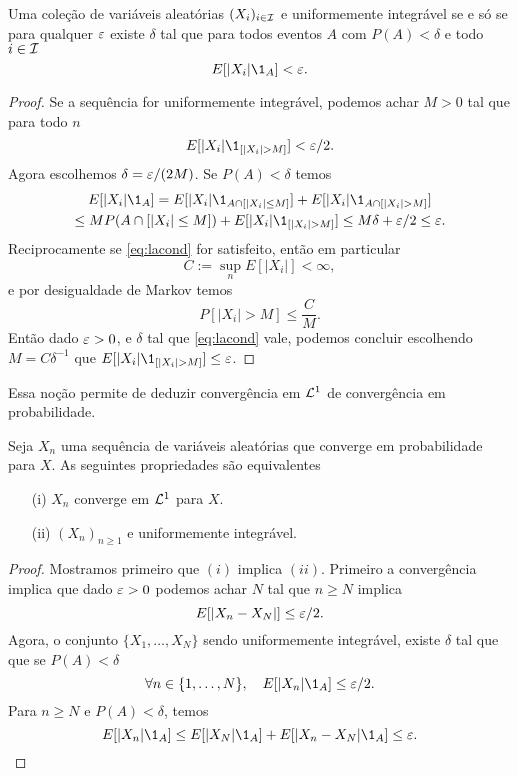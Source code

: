 \begin{topics}
\begin{proposition}
  Uma coleção de variáveis aleatórias $(X_i)_{i\in {\ensuremath{\mathcal I}}}$  e uniformemente integrável se
  e só se para qualquer $\varepsilon$ existe $\delta$ tal que para todos eventos  $A$ com $P(A)<\delta$ e todo $i \in {\ensuremath{\mathcal I}}$
  \begin{equation}\label{eq:lacond}
    E[|X_i|\1_{A}]<\gep.
  \end{equation}
\end{proposition}

\begin{proof}
  Se a sequência for uniformemente integrável,
  podemos achar $M>0$ tal que para todo $n$
  \begin{equation}
    E[|X_i|\1_{[|X_i|> M]}]<\gep/2.
  \end{equation}
  Agora escolhemos $\delta=\varepsilon/(2M)$.
  Se  $P(A)<\delta$ temos
  \begin{multline}
    E[|X_i|\1_{A}]= E[|X_i|\1_{A\cap [|X_i|\le  M]}]+E[|X_i|\1_{A\cap [|X_i|>  M]}]\\
    \le M P(A\cap [|X_i|\le  M])+ E[|X_i|\1_{[|X_i|>  M]}]\le M\delta +\gep/2\le \gep.
  \end{multline}
  Reciprocamente se \eqref{eq:lacond} for satisfeito, então em particular
  $$ C:=\sup_n E[|X_i|]<\infty,$$
  e por desigualdade de Markov temos
  \begin{equation*}
    P[|X_i|> M] \le \frac{C}{M}.
  \end{equation*}
  Então dado $\varepsilon>0$, e $\delta$ tal que \eqref{eq:lacond} vale,
  podemos concluir escolhendo $M=C\delta^{-1}$ que
  $E[|X_i|\1_{[|X_i|> M]}]\le \gep$.
\end{proof}

Essa noção permite de deduzir convergência em ${\mathcal L}^1$ de convergência em probabilidade.

\begin{theorem}
  Seja $X_n$ uma sequência de variáveis aleatórias que converge em probabilidade para $X$.
  As seguintes propriedades são equivalentes
  \begin{itemize}
  \item [(i)] $X_n$ converge em ${\mathcal L}^1$ para $X$.
  \item [(ii)] $(X_n)_{n\ge 1}$ e uniformemente integrável.
  \end{itemize}
\end{theorem}

\begin{proof}
  Mostramos primeiro que $(i)$ implica $(ii)$.
  Primeiro a convergência implica que dado $\varepsilon>0$ podemos achar $N$ tal que $n\ge N$ implica
  $$E[|X_n-X_N|]\le \varepsilon/2.$$
  Agora, o conjunto $\{X_1,\dots,X_N\}$ sendo uniformemente integrável, existe $\delta$ tal que que
  se $P(A)<\delta$
  $$ \forall n\in \{1,\dots,N\}, \quad E[|X_n|\1_{A}]\le \gep/2.$$
  Para $n\ge N$ e $P(A)<\delta$, temos
  \begin{equation*}
    E[|X_n|\1_{A}]\le  E[|X_N|\1_{A}]+ E[|X_n-X_N|\1_{A}]\le \gep.
  \end{equation*}


\end{proof}
\end{topics}
